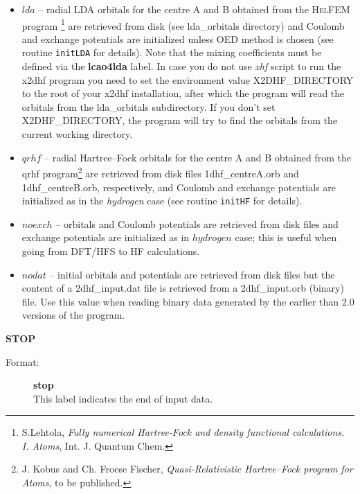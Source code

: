 \documentclass[12pt,a4paper]{article}
\newcommand{\ft}[1]{\texttt{#1}}
\begin{document}
\begin{description}
\begin{description}
\begin{itemize}
\item $lda$ -- radial LDA orbitals for the centre A and B
  obtained from the \textsc{HelFEM} program%
\footnote{S.Lehtola, \textsl{Fully numerical Hartree-Fock and density functional
    calculations. I. Atoms}, Int. J. Quantum Chem. } are retrieved
from disk (see lda\_orbitals directory) and Coulomb and exchange potentials are
initialized unless OED method is chosen (see routine \ft{initLDA} for details). Note that
the mixing coefficients must be defined via the \textbf{lcao4lda} label. In case you do
not use \textsl{xhf} script to run the x2dhf program you need to set the environment value
X2DHF\_DIRECTORY to the root of your x2dhf installation, after which the program will read
the orbitals from the lda\_orbitals subdirectory. If you don't set X2DHF\_DIRECTORY, the
program will try to find the orbitals from the current working directory.

\item $qrhf$ -- radial Hartree--Fock orbitals for the centre A and B
  obtained from the qrhf program\footnote{J. Kobus and Ch. Froese
    Fischer, \textsl{Quasi-Relativistic Hartree--Fock program for
      Atoms}, to be published.}  are retrieved from disk files
  1dhf\-\_centreA.\-orb and 1dhf\-\_centreB.\-orb, respectively, and
  Coulomb and exchange potentials are initialized as in the
  \textsl{hydrogen} case (see routine \ft{initHF} for details).

\item $noexch$ -- orbitals and Coulomb potentials are retrieved from disk files and
  exchange potentials are initialized as in $hydrogen$ case; this is useful when going
  from DFT/HFS to HF calculations.

\item $nodat$ -- initial orbitals and potentials are retrieved from disk files but the
  content of a 2dhf\_input.dat file is retrieved from a 2dhf\_input.orb (binary) file. Use
  this value when reading binary data generated by the earlier than 2.0 versions of the
  program.

\end{itemize}
\end{description}



\item \textbf{STOP}
\begin{description}
\item[Format:] \textbf{stop}\\
This label indicates the end of input data.
\end{description}

\end{description}
\end{document}
